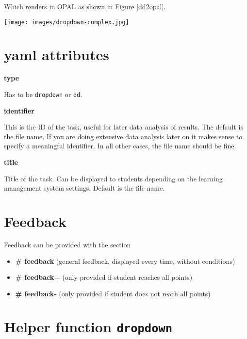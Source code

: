\documentclass[twoside]{tufte-book}
\providecommand{\tightlist}{%
  \setlength{\itemsep}{0pt}\setlength{\parskip}{0pt}}
\begin{document}
Which renders in OPAL as shown in Figure \ref{dd2opal}.

\begin{figure*}
\centering
\texttt{[image: images/dropdown-complex.jpg]}
\caption{\label{dd2opal}More complex dropdown task rendered in OPAL}
\end{figure*}

\section{yaml attributes}\label{yaml-attributes-3}

\noindent\textbf{type}\label{type-3}

Has to be \texttt{dropdown} or \texttt{dd}.

\noindent\textbf{identifier}\label{identifier-3}

This is the ID of the task, useful for later data analysis of results. The default is the file name. If you are doing extensive data analysis later on it makes sense to specify a meaningful identifier. In all other cases, the file name should be fine.

\noindent\textbf{title}\label{title-3}

Title of the task. Can be displayed to students depending on the learning management system settings. Default is the file name.

\section{Feedback}\label{feedback-3}

Feedback can be provided with the section

\begin{itemize}
\tightlist
\item
  \textbf{\# feedback} (general feedback, displayed every time, without conditions)
\item
  \textbf{\# feedback+} (only provided if student reaches all points)
\item
  \textbf{\# feedback-} (only provided if student does not reach all points)
\end{itemize}

\section{\texorpdfstring{Helper function \texttt{dropdown}}{Helper function dropdown}}\label{helper-function-dropdown}
\end{document}
